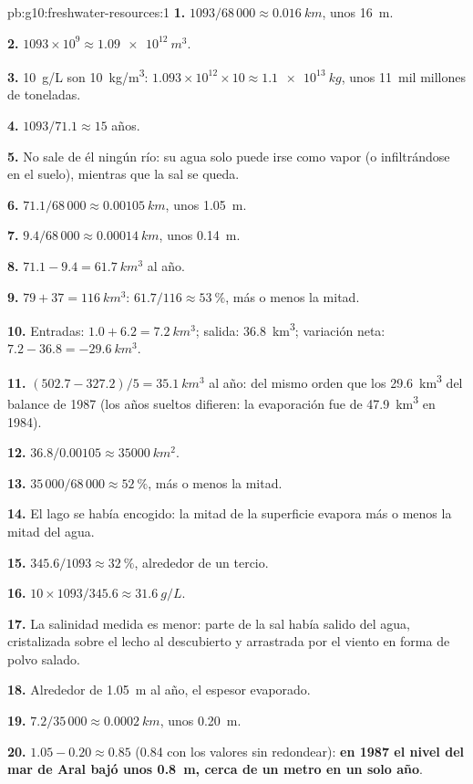 \begin{solution}{pb:g10:freshwater-resources:1}
\textbf{1.} $1093/68\,000 \approx \qty{0.016}{km}$, unos \qty{16}{m}.

\textbf{2.} $1093 \times 10^9 \approx \qty{1.09e12}{m^3}$.

\textbf{3.} \qty{10}{g/L} son \qty{10}{kg/m^3}: $1.093 \times 10^{12} \times 10
\approx \qty{1.1e13}{kg}$, unos \num{11}~mil millones de toneladas.

\textbf{4.} $1093/71.1 \approx 15$ años.

\textbf{5.} No sale de él ningún río: su agua solo puede irse como vapor (o
infiltrándose en el suelo), mientras que la sal se queda.

\textbf{6.} $71.1/68\,000 \approx \qty{0.00105}{km}$, unos \qty{1.05}{m}.

\textbf{7.} $9.4/68\,000 \approx \qty{0.00014}{km}$, unos \qty{0.14}{m}.

\textbf{8.} $71.1 - 9.4 = \qty{61.7}{km^3}$ al año.

\textbf{9.} $79 + 37 = \qty{116}{km^3}$: $61.7/116 \approx \qty{53}{\percent}$,
más o menos la mitad.

\textbf{10.} Entradas: $1.0 + 6.2 = \qty{7.2}{km^3}$; salida:
\qty{36.8}{km^3}; variación neta: $7.2 - 36.8 = \qty{-29.6}{km^3}$.

\textbf{11.} $(502.7 - 327.2)/5 = \qty{35.1}{km^3}$ al año: del mismo orden
que los \qty{29.6}{km^3} del balance de 1987 (los años sueltos difieren: la
evaporación fue de \qty{47.9}{km^3} en 1984).

\textbf{12.} $36.8/0.00105 \approx \qty{35000}{km^2}$.

\textbf{13.} $35\,000/68\,000 \approx \qty{52}{\percent}$, más o menos la
mitad.

\textbf{14.} El lago se había encogido: la mitad de la superficie evapora más
o menos la mitad del agua.

\textbf{15.} $345.6/1093 \approx \qty{32}{\percent}$, alrededor de un tercio.

\textbf{16.} $10 \times 1093/345.6 \approx \qty{31.6}{g/L}$.

\textbf{17.} La salinidad medida es menor: parte de la sal había salido del
agua, cristalizada sobre el lecho al descubierto y arrastrada por el viento
en forma de polvo salado.

\textbf{18.} Alrededor de \qty{1.05}{m} al año, el espesor evaporado.

\textbf{19.} $7.2/35\,000 \approx \qty{0.0002}{km}$, unos \qty{0.20}{m}.

\textbf{20.} $1.05 - 0.20 \approx 0.85$ (\num{0.84} con los valores sin
redondear): \textbf{en 1987 el nivel del mar de Aral bajó unos \qty{0.8}{m},
cerca de un metro en un solo año}.
\end{solution}
